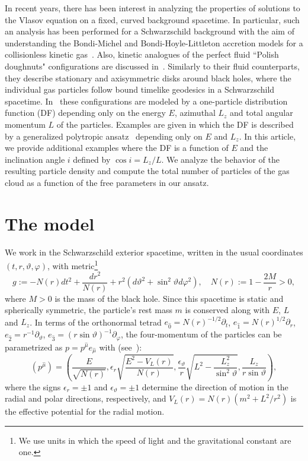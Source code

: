 \documentclass{appolb}
\begin{document}
In recent years, there has been interest in analyzing the properties of solutions to the Vlasov equation on a fixed, curved background spacetime. In particular, such an analysis has been performed for a Schwarzschild background with the aim of understanding the Bondi-Michel and Bondi-Hoyle-Littleton accretion models for a collisionless kinetic gas~\cite{pRoS17,aGetal2021,pMoA2021b}. Also, kinetic analogues of the perfect fluid ``Polish doughnuts" configurations are discussed in~\cite{cGoS2021b}. Similarly to their fluid counterparts, they describe stationary and axisymmetric disks around black holes, where the individual gas particles follow bound timelike geodesics in a Schwarzschild spacetime. In~\cite{cGoS2021b} these configurations are modeled by a one-particle distribution function (DF) depending only on the energy $E$, azimuthal $L_z$ and total angular momentum $L$ of the particles. Examples are given in which the DF is described by a generalized polytropic ansatz~\cite{eAhAaL16,eAhAaL19} depending only on $E$ and $L_z$. In this article, we provide additional examples where the DF is a function of $E$ and the inclination angle $i$ defined by $\cos i = L_z/L$. We analyze the behavior of the resulting particle density and compute the total number of particles of the gas cloud as a function of the free parameters in our ansatz.

\section{The model}
\label{Sec:Model}

We work in the Schwarzschild exterior spacetime, written in the usual coordinates $(t,r,\vartheta,\varphi)$, with metric\footnote{We use units in which the speed of light and the gravitational constant are one.}
\begin{equation}
\label{Eq:Smetric}
g := -N(r) dt^2 + \frac{dr^2}{N(r)} + r^2 \left( d\vartheta^2 + \sin^2\vartheta d\varphi^2 \right), \quad N(r) := 1-\frac{2M}{r} > 0,
\end{equation}
where $M > 0$ is the mass of the black hole. Since this spacetime is static and spherically symmetric, the particle's rest mass $m$ is conserved along with $E$, $L$ and $L_z$. In terms of the orthonormal tetrad $e_{\hat{0}} = N(r)^{-1/2}\partial_t$, $e_{\hat{1}} = N(r)^{1/2}\partial_r$, $e_{\hat{2}} = r^{-1}\partial_\vartheta$, $e_{\hat{3}} = (r\sin\vartheta)^{-1}\partial_\varphi$, the four-momentum of the particles can be parametrized as
$p = p^{\hat{\mu}} e_{\hat{\mu}}$ with (see~\cite[Eq. (58)]{aGetal2021}):
\begin{equation}
(p^{\hat{\mu}}) = \left( \frac{E}{\sqrt{N(r)}}, \epsilon_r \sqrt{\frac{E^2 - V_L(r)}{N(r)}},
\frac{\epsilon_\vartheta}{r}\sqrt{L^2 - \frac{L_z^2}{\sin^2\vartheta}}, \frac{L_z}{r\sin\vartheta} 
\right),
\label{Eq:OrthonormalBasis}
\end{equation}
where the signs $\epsilon_r = \pm 1$ and $\epsilon_\vartheta = \pm 1$ determine the direction of motion in the radial and polar directions, respectively, and $V_L(r) = N(r)(m^2 + L^2/r^2)$ is the effective potential for the radial motion.
\end{document}
